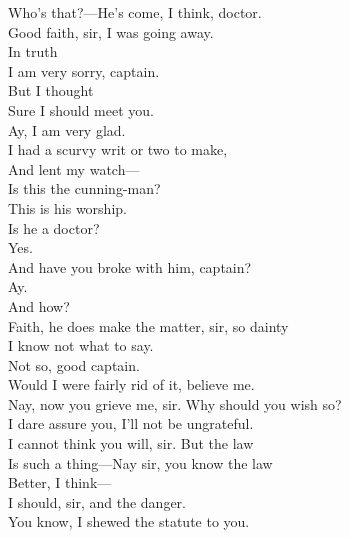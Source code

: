 \documentclass[a4paper,oneside,12pt]{memoir}
\begin{document}
\begin{drama*}
\facespeaks {} Who's that?---He's come, I think, doctor.\\
Good faith, sir, I was going away.\\
\dapperspeaks {} In truth\\
I am very sorry, captain.\\
\facespeaks {} But I thought\\
Sure I should meet you.\\
\dapperspeaks {} Ay, I am very glad.\\
I had a scurvy writ or two to make,\\
And lent my watch---\\
 Is this the cunning-man?\\
\facespeaks This is his worship.\\
\dapperspeaks {} Is he a doctor?\\
\facespeaks {} Yes.\\
\dapperspeaks And have you broke with him, captain?\\
\facespeaks {} Ay.\\
\dapperspeaks {} And how?\\
\facespeaks Faith, he does make the matter, sir, so dainty\\
I know not what to say.\\
\dapperspeaks {} Not so, good captain.\\
\facespeaks Would I were fairly rid of it, believe me.\\
\dapperspeaks Nay, now you grieve me, sir. Why should you wish so?\\
I dare assure you, I'll not be ungrateful.\\
\facespeaks I cannot think you will, sir. But the law\\
Is such a thing---Nay sir, you know the law\\
Better, I think---\\
\dapperspeaks {} I should, sir, and the danger.\\
You know, I shewed the statute to you.\\

\end{drama*}
\end{document}
